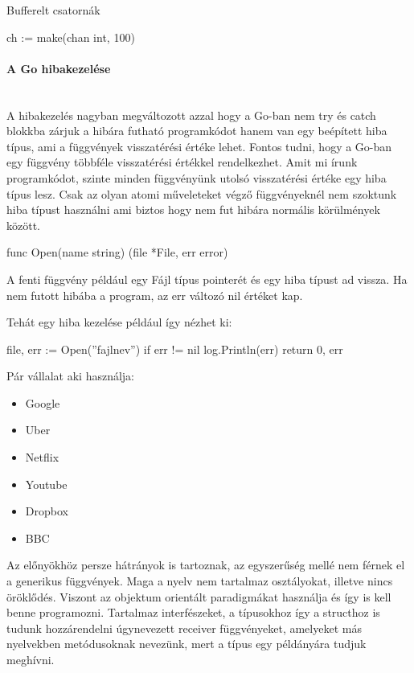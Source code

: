 Bufferelt csatornák
\begin{python}
    ch := make(chan int, 100)
\end{python}

\paragraph{A Go hibakezelése} \mbox{} \\
A hibakezelés nagyban megváltozott azzal hogy a Go-ban nem try és catch blokkba zárjuk a hibára futható programkódot
hanem van egy beépített hiba típus, ami a függvények visszatérési értéke lehet. Fontos tudni, hogy a Go-ban egy függvény többféle
visszatérési értékkel rendelkezhet. Amit mi írunk programkódot, szinte minden függvényünk utolsó visszatérési értéke egy hiba típus lesz.
Csak az olyan atomi műveleteket végző függvényeknél nem szoktunk hiba típust használni ami biztos hogy nem fut hibára normális körülmények között.
\begin{python}
    func Open(name string) (file *File, err error)
\end{python}
A fenti függvény például egy Fájl típus pointerét és egy hiba típust ad vissza. Ha nem futott hibába a program, az err változó nil értéket kap.

Tehát egy hiba kezelése például így nézhet ki:
\begin{python}
    file, err := Open(''fajlnev'')
    if err != nil {
    log.Println(err)
    return 0, err
    }
\end{python}



Pár vállalat aki használja:
\begin{itemize}
    \item Google
    \item Uber
    \item Netflix
    \item Youtube
    \item Dropbox
    \item BBC
\end{itemize}

Az előnyökhöz persze hátrányok is tartoznak, az egyszerűség mellé nem férnek el a generikus függvények.
Maga a nyelv nem tartalmaz osztályokat, illetve nincs öröklődés.
Viszont az objektum orientált paradigmákat használja és így is kell benne programozni.
Tartalmaz interfészeket, a típusokhoz így a structhoz is tudunk hozzárendelni úgynevezett receiver függvényeket, amelyeket más nyelvekben metódusoknak nevezünk, mert a típus egy példányára tudjuk meghívni.

